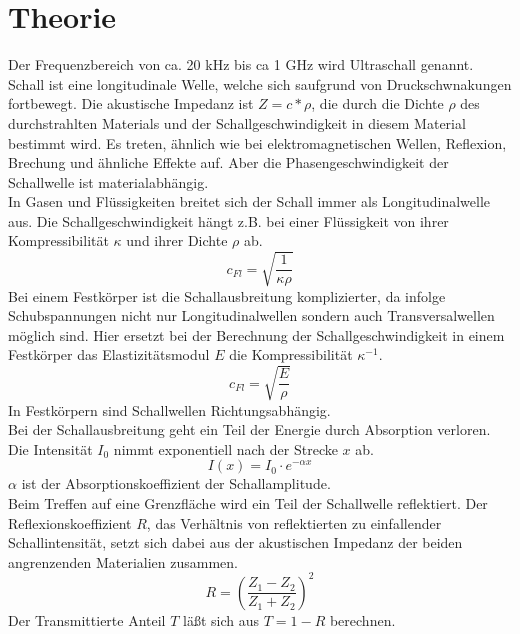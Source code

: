 \section{Theorie}
\label{sec:Theorie}

Der Frequenzbereich von ca. 20 kHz bis ca 1 GHz wird Ultraschall genannt.
Schall ist eine longitudinale Welle, welche sich saufgrund von Druckschwnakungen fortbewegt.
Die akustische Impedanz ist $Z = c * \rho$, die durch die Dichte $\rho$ des durchstrahlten Materials und der Schallgeschwindigkeit in diesem Material bestimmt wird.
Es treten, ähnlich wie bei elektromagnetischen Wellen, Reflexion, Brechung und ähnliche Effekte auf.
Aber die Phasengeschwindigkeit der Schallwelle ist materialabhängig. \\

In Gasen und Flüssigkeiten breitet sich der Schall immer als Longitudinalwelle aus.
Die Schallgeschwindigkeit hängt z.B. bei einer Flüssigkeit von ihrer Kompressibilität $\kappa$ und ihrer Dichte $\rho$ ab.
\begin{equation}
    c_{Fl} = \sqrt{\frac{1}{\kappa \rho}}
    \label{eqn:gl1}
\end{equation}
Bei einem Festkörper ist die Schallausbreitung komplizierter, da infolge Schubspannungen nicht nur Longitudinalwellen sondern auch Transversalwellen möglich sind.
Hier ersetzt bei der Berechnung der Schallgeschwindigkeit in einem Festkörper das Elastizitätsmodul $E$ die Kompressibilität $\kappa^{-1}$.
\begin{equation}
    c_{Fl} = \sqrt{\frac{E}{\rho}}
    \label{eqn:gl2}
\end{equation}
In Festkörpern sind Schallwellen Richtungsabhängig. \\

Bei der Schallausbreitung geht ein Teil der Energie durch Absorption verloren.
Die Intensität $I_0$ nimmt exponentiell nach der Strecke $x$ ab.
\begin{equation}
    I(x) = I_0 \cdot e^{-\alpha x}
    \label{eqn:gl3}
\end{equation}
$\alpha$ ist der Absorptionskoeffizient der Schallamplitude. \\

Beim Treffen auf eine Grenzfläche wird ein Teil der Schallwelle reflektiert.
Der Reflexionskoeffizient $R$, das Verhältnis von reflektierten zu einfallender Schallintensität, setzt sich dabei aus der akustischen Impedanz der beiden angrenzenden Materialien zusammen.
\begin{equation}
    R = \left(\frac{Z_1-Z_2}{Z_1+Z_2}\right)^2
\end{equation}
Der Transmittierte Anteil $T$ läßt sich aus $T = 1 − R$ berechnen.\\

